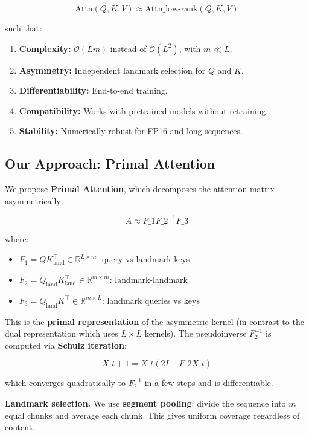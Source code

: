 \[
\text{Attn}(Q, K, V) \approx \text{Attn}\_\text{low-rank}(Q, K, V)
\]

such that:

\begin{enumerate}
\item \textbf{Complexity:} $\mathcal{O}(L m)$ instead of $\mathcal{O}(L^2)$, with $m \ll L$.
\item \textbf{Asymmetry:} Independent landmark selection for $Q$ and $K$.
\item \textbf{Differentiability:} End-to-end training.
\item \textbf{Compatibility:} Works with pretrained models without retraining.
\item \textbf{Stability:} Numerically robust for FP16 and long sequences.

\end{enumerate}
\subsection{Our Approach: Primal Attention}

We propose \textbf{Primal Attention}, which decomposes the attention matrix 
asymmetrically:

\[
A \approx F\_1 F\_2^{-1} F\_3
\]

where:

\begin{itemize}
\item $F_1 = Q K_\text{land}^\top \in \mathbb{R}^{L \times m}$: query vs landmark keys
\item $F_2 = Q_\text{land} K_\text{land}^\top \in \mathbb{R}^{m \times m}$: landmark-landmark
\item $F_3 = Q_\text{land} K^\top \in \mathbb{R}^{m \times L}$: landmark queries vs keys

\end{itemize}
This is the \textbf{primal representation} of the asymmetric kernel (in contrast 
to the dual representation which uses $L \times L$ kernels). The pseudoinverse 
$F_2^{-1}$ is computed via \textbf{Schulz iteration}:

\[
X\_{t+1} = X\_t (2I - F\_2 X\_t)
\]

which converges quadratically to $F_2^{-1}$ in a few steps and is differentiable.

\textbf{Landmark selection.} We use \textbf{segment pooling}: divide the sequence into 
$m$ equal chunks and average each chunk. This gives uniform coverage 
regardless of content.

